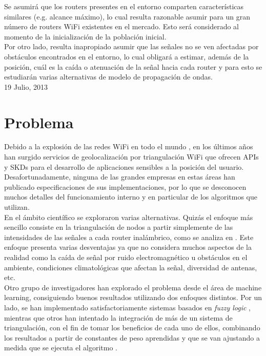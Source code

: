 \documentclass[journal]{IEEEtran}
\begin{document}
Se asumirá que los routers presentes en el entorno comparten características similares (e.g. alcance máximo), lo cual resulta razonable asumir para un gran número de routers WiFi existentes en el mercado. Esto será considerado al momento de la inicialización de la población inicial.\\

Por otro lado, resulta inapropiado asumir que las señales no se ven afectadas por obstáculos encontrados en el entorno, lo cual obligará a estimar, además de la posición, cuál es la caída o atenuación de la señal hacia cada router y para esto se estudiarán varias alternativas de modelo de propagación de ondas.\\

\hfill 19 Julio, 2013

\section{Problema}

Debido a la explosión de las redes WiFi en todo el mundo \cite{wifi:coverage}, en los últimos años han surgido servicios de geolocalización por triangulación WiFi \cite{wifi:positioning} que ofrecen APIs \cite{google:maps} y SKDs  \cite{skyhook:location} para el desarrollo de aplicaciones sensibles a la posición del usuario.\\

Desafortunadamente, ninguna de las grandes empresas en estas áreas han publicado especificaciones de sus implementaciones, por lo que se desconocen muchos detalles del funcionamiento interno y en particular de los algoritmos que utilizan.\\

En el ámbito científico se exploraron varias alternativas. Quizás el enfoque más sencillo consiste en la triangulación de nodos a partir simplemente de las intensidades de las señales a cada router inalámbrico, como se analiza en \cite{simple:triangulation}. Este enfoque presenta varias desventajas ya que no considera muchos aspectos de la realidad como la caída de señal por ruido electromagnético u obstáculos en el ambiente, condiciones climatológicas que afectan la señal, diversidad de antenas, etc.\\

Otro grupo de investigadores han explorado el problema desde el área de machine learning, consiguiendo buenos resultados utilizando dos enfoques distintos. Por un lado, se han implementado satisfactoriamente sistemas basados en \textit{fuzzy logic} \cite{fuzzy:logic:based:system}, mientras que otros han intentado la integración de más de un sistema de triangulación, con el fin de tomar los beneficios de cada uno de ellos, combinando los resultados a partir de constantes de peso aprendidas y que se van ajustando a medida que se ejecuta el algoritmo \cite{adaptive:weighting}.\\
\end{document}
